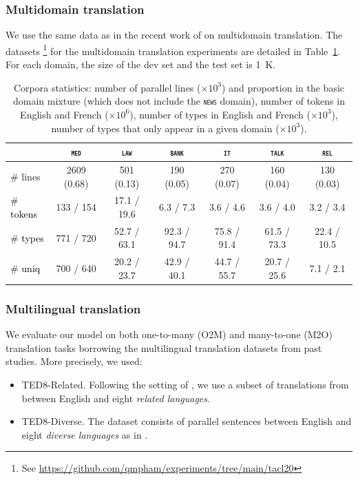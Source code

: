 \documentclass[11pt]{article}
\newcommand{\fyDone}[1]{\done[FY]\Todo[FY:]{\textcolor{orange}{#1}}}
\newcommand{\revisiondone}[1]{\textcolor{black}{#1}}
\newcommand{\domain}[1]{\texttt{\textsc{#1}}}
\begin{document}
\subsubsection{Multidomain translation}
We use the same data as in the recent work of \citet{Pham21revisiting} on multidomain translation.\fyDone{Add public to the data link} The datasets \footnote{See \url{https://github.com/qmpham/experiments/tree/main/tacl20}} for the multidomain translation experiments are detailed in Table~\ref{tab:Corpora-chap4}. For each domain, the size of the dev set and the test set is 1~K. 
\begin{table}[h!]
  \centering
  \begin{tabular}{|l|cccccc|} %
    \cline{2-7} 
    \multicolumn{1}{c|}{} & \multicolumn{1}{c}{\domain{med}} & \multicolumn{1}{c}{\domain{law}} & \multicolumn{1}{c}{\domain{bank}} & \multicolumn{1}{c}{\domain{it}} & \multicolumn{1}{c}{\domain{talk}} & \multicolumn{1}{c}{\domain{rel}} \\
    \hline 
    \# lines & 2609 (0.68) & 501 (0.13) & 190 (0.05) & 270 (0.07) & 160 (0.04) & 130 (0.03) \\
    \# \revisiondone{tokens}  &  133 / 154  &  17.1 / 19.6 &  6.3 / 7.3 &  3.6 / 4.6 &  3.6 / 4.0 &  3.2 / 3.4 \\
    \# \revisiondone{types}  & 771 / 720 & 52.7 / 63.1 & 92.3 / 94.7 & 75.8 / 91.4 & 61.5 / 73.3 & 22.4 / 10.5 \\
    \# \revisiondone{uniq} & 700 / 640 & 20.2 / 23.7 & 42.9 / 40.1 & 44.7 / 55.7 & 20.7 / 25.6 & 7.1 / 2.1 \\
    \hline
  \end{tabular}
  \caption{Corpora statistics: number of parallel lines ($\times 10^3$) and proportion in the basic domain mixture (which does not include the \domain{news} domain), number of tokens in English and French ($\times 10^6$), number of types in English and French ($\times 10^3$), number of types that only appear in a given domain ($\times 10^3$).}
\label{tab:Corpora-chap4}
\end{table}
\subsubsection{Multilingual translation}
We evaluate our model on both one-to-many (O2M) and many-to-one (M2O)
translation tasks borrowing the multilingual translation datasets from past studies. More precisely, we used: 
\begin{itemize}
\item TED8-Related. Following the setting of \citet{Wang20balancing}, we use a subset of translations from \citet{qi18when} between English and eight \emph{related languages}.
\item TED8-Diverse. The dataset consists of parallel sentences between English and eight \emph{diverse languages} as in \citet{Wang20balancing}.
\end{itemize}
\end{document}
